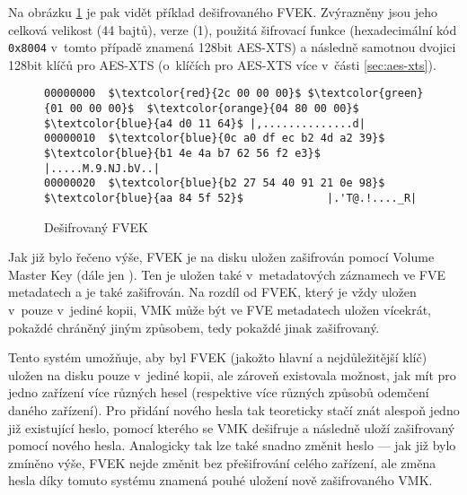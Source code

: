 Na obrázku \ref{fig:fvek-decrypted} je pak vidět příklad dešifrovaného FVEK. Zvýrazněny jsou jeho celková velikost (44 bajtů), verze (1), použitá šifrovací funkce (hexadecimální kód \texttt{0x8004} v~tomto případě znamená 128bit AES-XTS) a následně samotnou dvojici 128bit klíčů pro AES-XTS (o~klíčích pro AES-XTS více v~části \ref{sec:aes-xts}).

\begin{figure}[h]
		\centering
		\captionsetup{width=0.65\linewidth}
\begin{lstlisting}[frame=none, escapechar=$, basicstyle=\ttfamily\small, columns=fullflexible, keepspaces=true]
00000000  $\textcolor{red}{2c 00 00 00}$ $\textcolor{green}{01 00 00 00}$  $\textcolor{orange}{04 80 00 00}$ $\textcolor{blue}{a4 d0 11 64}$ |,..............d|
00000010  $\textcolor{blue}{0c a0 df ec b2 4d a2 39}$  $\textcolor{blue}{b1 4e 4a b7 62 56 f2 e3}$ |.....M.9.NJ.bV..|
00000020  $\textcolor{blue}{b2 27 54 40 91 21 0e 98}$  $\textcolor{blue}{aa 84 5f 52}$             |.'T@.!...._R|
\end{lstlisting}
		\caption{Dešifrovaný FVEK}
		\label{fig:fvek-decrypted}
\end{figure}


\label{sec:vmk}

Jak již bylo řečeno výše, FVEK je na disku uložen zašifrován pomocí Volume Master Key (dále jen ). Ten je uložen také v~metadatových záznamech ve FVE metadatech a je také zašifrován. Na rozdíl od FVEK, který je vždy uložen v~pouze v~jediné kopii, VMK může být ve FVE metadatech uložen vícekrát, pokaždé chráněný jiným způsobem, tedy pokaždé jinak zašifrovaný.

Tento systém umožňuje, aby byl FVEK (jakožto hlavní a nejdůležitější klíč) uložen na disku pouze v~jediné kopii, ale zároveň existovala možnost, jak mít pro jedno zařízení více různých hesel (respektive více různých způsobů odemčení daného zařízení)\cite{Kornblum2009}. Pro přidání nového hesla tak teoreticky stačí znát alespoň jedno již existující heslo\cite{Lich2016}, pomocí kterého se VMK dešifruje a následně uloží zašifrovaný pomocí nového hesla. Analogicky tak lze také snadno změnit heslo --- jak již bylo zmíněno výše, FVEK nejde změnit bez přešifrování celého zařízení, ale změna hesla díky tomuto systému znamená pouhé uložení nově zašifrovaného VMK.

